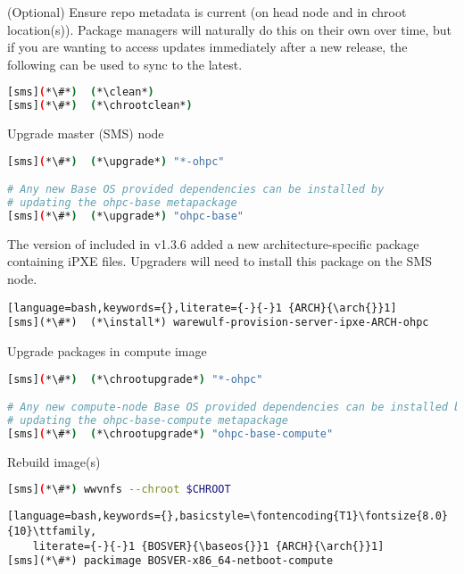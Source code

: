 \begin{enumerate*}
\item (Optional) Ensure repo metadata is current (on head node and in chroot
  location(s)). Package managers will naturally do this on their own over time,
  but if you are wanting to access updates immediately after a new release,
  the following can be used to sync to the latest.

\begin{lstlisting}[language=bash,keywords={}]
[sms](*\#*)  (*\clean*)
[sms](*\#*)  (*\chrootclean*)
\end{lstlisting}

\item Upgrade master (SMS) node

\begin{lstlisting}[language=bash,keywords={}]
[sms](*\#*)  (*\upgrade*) "*-ohpc"

# Any new Base OS provided dependencies can be installed by
# updating the ohpc-base metapackage
[sms](*\#*)  (*\upgrade*) "ohpc-base"
\end{lstlisting}
  
\begin{center}
\begin{tcolorbox}[]
\small
The version of \Warewulf{} included in \OHPC{} v1.3.6 added a new
architecture-specific package containing iPXE files. Upgraders will need to
install this package on the SMS node.
\begin{lstlisting}[language=bash,keywords={},literate={-}{-}1 {ARCH}{\arch{}}1]
[sms](*\#*)  (*\install*) warewulf-provision-server-ipxe-ARCH-ohpc
\end{lstlisting}
\end{tcolorbox}
\end{center}
\fi

\item Upgrade packages in compute image

\begin{lstlisting}[language=bash,keywords={}]
[sms](*\#*)  (*\chrootupgrade*) "*-ohpc"

# Any new compute-node Base OS provided dependencies can be installed by
# updating the ohpc-base-compute metapackage
[sms](*\#*)  (*\chrootupgrade*) "ohpc-base-compute"
\end{lstlisting}
  
\item Rebuild image(s)

\begin{lstlisting}[language=bash,keywords={}]
[sms](*\#*) wwvnfs --chroot $CHROOT
\end{lstlisting}
\fi

\begin{lstlisting}[language=bash,keywords={},basicstyle=\fontencoding{T1}\fontsize{8.0}{10}\ttfamily,
    literate={-}{-}1 {BOSVER}{\baseos{}}1 {ARCH}{\arch{}}1]
[sms](*\#*) packimage BOSVER-x86_64-netboot-compute
\end{lstlisting}
\fi

\end{enumerate*}

